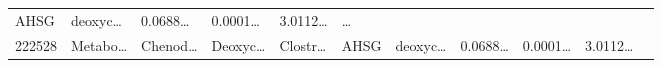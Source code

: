 \documentclass[
]{article}
\begin{document}
\begin{longtable}[]{@{}lllllllllll@{}}
\begin{minipage}[t]{0.07\columnwidth}
AHSG\strut
\end{minipage} & \begin{minipage}[t]{0.09\columnwidth}\raggedright
deoxyc\ldots{}\strut
\end{minipage} & \begin{minipage}[t]{0.07\columnwidth}\raggedright
0.0688\ldots{}\strut
\end{minipage} & \begin{minipage}[t]{0.07\columnwidth}\raggedright
0.0001\ldots{}\strut
\end{minipage} & \begin{minipage}[t]{0.07\columnwidth}\raggedright
3.0112\ldots{}\strut
\end{minipage} & \begin{minipage}[t]{0.03\columnwidth}\raggedright
\ldots{}\strut
\end{minipage}\tabularnewline
\begin{minipage}[t]{0.05\columnwidth}\raggedright
222528\strut
\end{minipage} & \begin{minipage}[t]{0.07\columnwidth}\raggedright
Metabo\ldots{}\strut
\end{minipage} & \begin{minipage}[t]{0.07\columnwidth}\raggedright
Chenod\ldots{}\strut
\end{minipage} & \begin{minipage}[t]{0.09\columnwidth}\raggedright
Deoxyc\ldots{}\strut
\end{minipage} & \begin{minipage}[t]{0.07\columnwidth}\raggedright
Clostr\ldots{}\strut
\end{minipage} & \begin{minipage}[t]{0.07\columnwidth}\raggedright
AHSG\strut
\end{minipage} & \begin{minipage}[t]{0.09\columnwidth}\raggedright
deoxyc\ldots{}\strut
\end{minipage} & \begin{minipage}[t]{0.07\columnwidth}\raggedright
0.0688\ldots{}\strut
\end{minipage} & \begin{minipage}[t]{0.07\columnwidth}\raggedright
0.0001\ldots{}\strut
\end{minipage} & \begin{minipage}[t]{0.07\columnwidth}\raggedright
3.0112\ldots{}\strut
\end{minipage} & \begin{minipage}[t]{0.03\columnwidth}\raggedright

\end{minipage}
\end{longtable}
\end{document}
